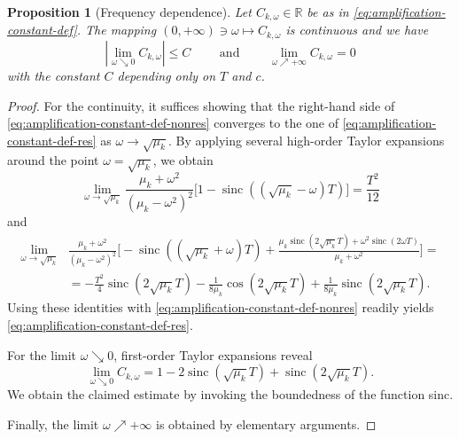 \documentclass{amsart}
\theoremstyle{plain}
\newtheorem{proposition}[theorem]{Proposition}
\theoremstyle{remark}
\numberwithin{equation}{section}
\numberwithin{theorem}{section}
\newcommand{\R}{\mathbb{R}}
\newcommand{\sinc}{\operatorname{sinc}}
\begin{document}
\begin{proposition}[Frequency dependence]
\label{P:frequency-dependence}
Let $C_{k, \omega } \in \R$ be as in \eqref{eq:amplification-constant-def}. The mapping $(0,+\infty) \ni \omega \mapsto C_{k,\omega}$ is continuous and we have
\begin{equation*}
\label{eq:frequency-dependence}
\left |\lim_{\omega \searrow 0} C_{k,\omega}\right| \leq C 
\qquad \text{ and } \qquad 
\lim_{\omega \nearrow +\infty} C_{k,\omega} = 0
\end{equation*}
with the constant $C$ depending only on $T$ and $c$.
\end{proposition}
\begin{proof}
For the continuity, it suffices showing that the right-hand side of \eqref{eq:amplification-constant-def-nonres} converges to the one of \eqref{eq:amplification-constant-def-res} as $\omega \to \sqrt{\mu_k}$. By applying several high-order Taylor expansions around the point $\omega = \sqrt{\mu_k}$, we obtain
\begin{equation*}
	\lim_{\omega \to \sqrt{\mu_k}}\frac{\mu_k+\omega^2}{(\mu_k-\omega^2)^2}\Bigg[1-\sinc((\sqrt{\mu_k}-\omega)T)\Bigg] = \frac{T^2}{12}
\end{equation*}
and
\begin{equation*}
	\begin{aligned}
		\lim_{\omega \to \sqrt{\mu_k}} &  \frac{\mu_k+\omega^2}{(\mu_k-\omega^2)^2}\Bigg[-\sinc((\sqrt{\mu_k}+\omega)T)+ \frac{\mu_k\sinc(2\sqrt{\mu_k} T) + \omega^2\sinc(2\omega T)}{\mu_k + \omega^2}\Bigg] = \\ & = -\frac{T^2}{4}\sinc(2\sqrt{\mu_k} T) - \frac{1}{8\mu_k}\cos(2\sqrt{\mu_k} T) + \frac{1}{8\mu_k}\sinc(2\sqrt{\mu_k} T).
	\end{aligned}
\end{equation*}
Using these identities with \eqref{eq:amplification-constant-def-nonres} readily yields \eqref{eq:amplification-constant-def-res}. 

For the limit $\omega \searrow 0$, first-order Taylor expansions reveal
\begin{equation*}
	\lim\limits_{\omega \searrow 0} C_{k, \omega} = 1-2\sinc(\sqrt{\mu_k}T)+\sinc(2\sqrt{\mu_k}T).
\end{equation*}
We obtain the claimed estimate by invoking the boundedness of the function sinc.

Finally, the limit $\omega \nearrow +\infty$ is obtained by elementary arguments.
\end{proof}
\end{document}

